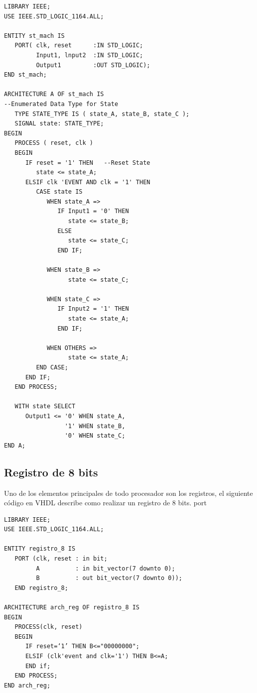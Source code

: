 \begin{lstlisting}[style=vhdl, basicstyle=\footnotesize\ttfamily]
LIBRARY IEEE;
USE IEEE.STD_LOGIC_1164.ALL;

ENTITY st_mach IS
   PORT( clk, reset      :IN STD_LOGIC;
         Input1, lnput2  :IN STD_LOGIC;
         Output1         :OUT STD_LOGIC);
END st_mach;

ARCHITECTURE A OF st_mach IS
--Enumerated Data Type for State
   TYPE STATE_TYPE IS ( state_A, state_B, state_C );
   SIGNAL state: STATE_TYPE;
BEGIN
   PROCESS ( reset, clk )
   BEGIN
      IF reset = '1' THEN   --Reset State
         state <= state_A;
      ELSIF clk 'EVENT AND clk = '1' THEN
         CASE state IS
            WHEN state_A =>
               IF Input1 = '0' THEN
                  state <= state_B;
               ELSE
                  state <= state_C;
               END IF;

            WHEN state_B =>
                  state <= state_C;

            WHEN state_C =>
               IF Input2 = '1' THEN
                  state <= state_A;
               END IF;

            WHEN OTHERS =>
                  state <= state_A;
         END CASE;
      END IF;
   END PROCESS;
   
   WITH state SELECT
      Output1 <= '0' WHEN state_A,
                 '1' WHEN state_B,
                 '0' WHEN state_C;
END A;
\end{lstlisting}

\subsection{Registro de 8 bits}
Uno de los elementos principales de todo procesador son los registros, el siguiente código 
en VHDL describe como realizar un registro de 8 bits.
port
\begin{lstlisting}[style=vhdl, basicstyle=\footnotesize\ttfamily]
LIBRARY IEEE;
USE IEEE.STD_LOGIC_1164.ALL;

ENTITY registro_8 IS
   PORT (clk, reset : in bit; 
         A          : in bit_vector(7 downto 0);
         B          : out bit_vector(7 downto 0));
   END registro_8;

ARCHITECTURE arch_reg OF registro_8 IS
BEGIN
   PROCESS(clk, reset)
   BEGIN
      IF reset=‘1’ THEN B<="00000000";
      ELSIF (clk'event and clk='1') THEN B<=A;
      END if;
   END PROCESS;
END arch_reg;
 
\end{lstlisting}

